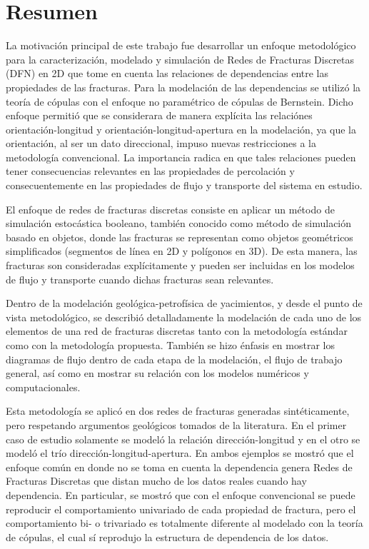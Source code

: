 \chapter*{Resumen}

La motivaci\'on principal de este trabajo fue desarrollar un enfoque metodol\'ogico para la caracterizaci\'on, modelado y simulaci\'on de Redes de Fracturas Discretas (DFN) en 2D que tome en cuenta las relaciones de dependencias entre las propiedades de las fracturas.
Para la modelaci\'on de las dependencias se utiliz\'o la teor\'ia de c\'opulas con el enfoque no param\'etrico de c\'opulas de Bernstein.
Dicho enfoque permiti\'o que se considerara de manera expl\'icita las relaci\'ones orientaci\'on-longitud  y orientaci\'on-longitud-apertura en la modelaci\'on, ya que la orientaci\'on, al ser un dato direccional, impuso nuevas restricciones a la metodolog\'ia convencional.
La importancia radica en que tales relaciones pueden tener consecuencias relevantes en las propiedades de percolaci\'on y consecuentemente en las propiedades de flujo y transporte del sistema en estudio.

El enfoque de redes de fracturas discretas consiste en aplicar un m\'etodo de simulaci\'on estoc\'astica booleano, tambi\'en conocido como m\'etodo de simulaci\'on basado en objetos, donde las fracturas se representan como objetos geom\'etricos simplificados (segmentos de l\'inea en 2D y pol\'igonos en 3D).
De esta manera, las fracturas son consideradas expl\'icitamente y pueden ser incluidas en los modelos de flujo y transporte cuando dichas fracturas sean relevantes.

Dentro de la modelaci\'on geol\'ogica-petrof\'isica de yacimientos, y desde el punto de vista metodol\'ogico, se describi\'o detalladamente la modelaci\'on de cada uno de los elementos de una red de fracturas discretas tanto con la metodolog\'ia est\'andar como con la metodolog\'ia propuesta.
Tambi\'en se hizo \'enfasis en mostrar los diagramas de flujo dentro de cada etapa de la modelaci\'on, el flujo de trabajo general, as\'i como en mostrar su relaci\'on con los modelos num\'ericos y computacionales.

Esta metodolog\'ia se aplic\'o en dos redes de fracturas generadas sint\'eticamente, pero respetando argumentos geol\'ogicos tomados de la literatura.
En el primer caso de estudio solamente se model\'o la relaci\'on direcci\'on-longitud y en el otro se model\'o el tr\'io direcci\'on-longitud-apertura.
En ambos ejemplos se mostr\'o que el enfoque com\'un en donde no se toma en cuenta la dependencia genera Redes de Fracturas Discretas que distan mucho de los datos reales cuando hay dependencia.
En particular, se mostr\'o que con el enfoque convencional se puede reproducir el comportamiento univariado de cada propiedad de fractura, pero el comportamiento bi- o trivariado es totalmente diferente al modelado con la teor\'ia de c\'opulas, el cual s\'i reprodujo la estructura de dependencia de los datos.
